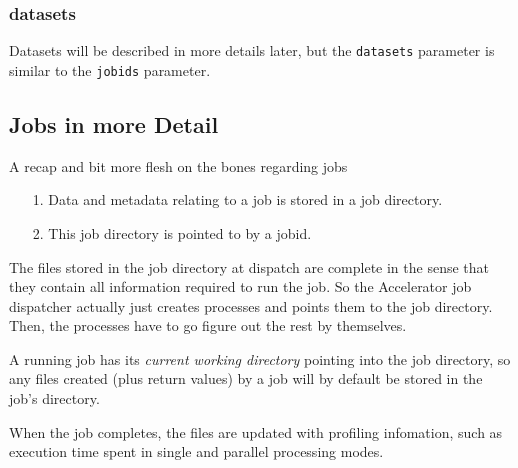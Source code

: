 \documentclass[a4paper]{article}
\begin{document}
\subsubsection{datasets}
Datasets will be described in more details later, but the
\texttt{datasets} parameter is similar to the \texttt{jobids}
parameter.


\clearpage



\subsection{Jobs in more Detail}
A recap and bit more flesh on the bones regarding jobs
\begin{itemize}
\item[1.]  Data and metadata relating to a job is stored in a job directory.
\item[2.]  This job directory is pointed to by a jobid.
\end{itemize}
The files stored in the job directory at dispatch are complete in the
sense that they contain all information required to run the job.  So
the Accelerator job dispatcher actually just creates processes and
points them to the job directory.  Then, the processes have to go
figure out the rest by themselves.

A running job has its \textsl{current working directory} pointing into
the job directory, so any files created (plus return values) by a job
will by default be stored in the job's directory.

When the job completes, the files are updated with profiling
infomation, such as execution time spent in single and parallel
processing modes.
\end{document}
